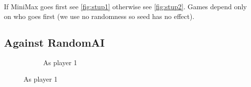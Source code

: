 \documentclass{article}
\newcommand{\rd}{\node [player, fill=red]{};}
\newcommand{\yw}{\node [player, fill=yellow] {};}
\newcommand{\gy}{\node [player, fill=white] {};}
\begin{document}
	If MiniMax goes first see \ref{fig:stup1} otherwise see \ref{fig:stup2}. Games depend only on who goes first (we use no randomness so seed has no effect).
	
	\newpage
	\subsection{Against RandomAI}
	
	\begin{figure}[h]
		\centering
\begin{subfigure}[b]{0.4\linewidth}%
	\centering%
	\caption{As player 1}%
	\label{fig:ran2}%
	\end{subfigure}%
	

\end{figure}
\end{document}
